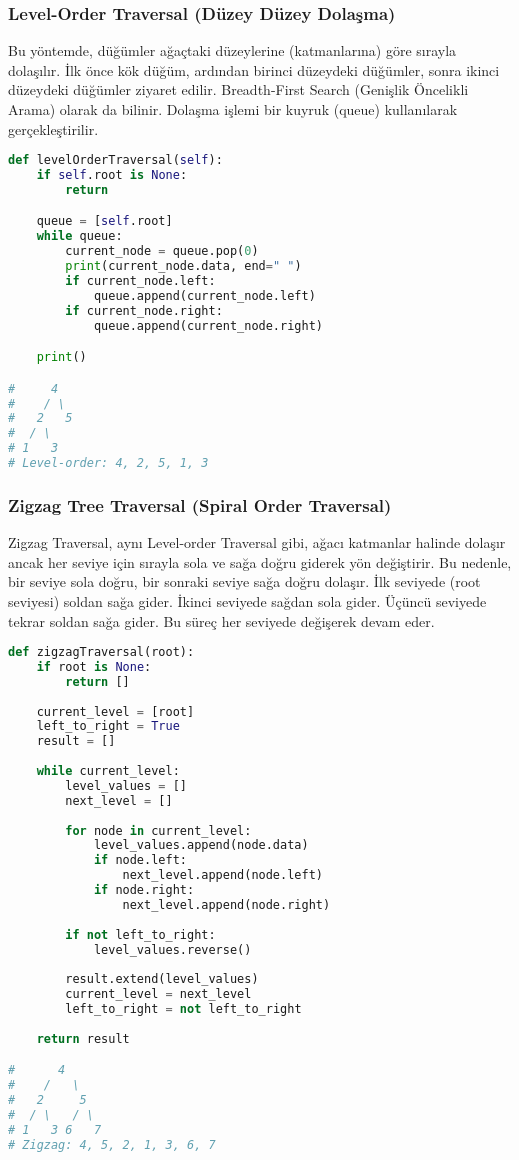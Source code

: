 \newpage

\subsubsection{Level-Order Traversal (Düzey Düzey Dolaşma)}

Bu yöntemde, düğümler ağaçtaki düzeylerine (katmanlarına) göre sırayla dolaşılır. İlk önce kök düğüm, ardından birinci düzeydeki düğümler, sonra ikinci düzeydeki düğümler ziyaret edilir. Breadth-First Search (Genişlik Öncelikli Arama) olarak da bilinir. Dolaşma işlemi bir kuyruk (queue) kullanılarak gerçekleştirilir.

\begin{lstlisting}[language=Python]
def levelOrderTraversal(self):
    if self.root is None:
        return

    queue = [self.root]
    while queue:
        current_node = queue.pop(0)
        print(current_node.data, end=" ")
        if current_node.left:
            queue.append(current_node.left)
        if current_node.right:
            queue.append(current_node.right)

    print()

#     4
#    / \
#   2   5
#  / \
# 1   3
# Level-order: 4, 2, 5, 1, 3
\end{lstlisting}

\newpage

\subsubsection{Zigzag Tree Traversal (Spiral Order Traversal)}

Zigzag Traversal, aynı Level-order Traversal gibi, ağacı katmanlar halinde dolaşır ancak her seviye için sırayla sola ve sağa doğru giderek yön değiştirir. Bu nedenle, bir seviye sola doğru, bir sonraki seviye sağa doğru dolaşır. İlk seviyede (root seviyesi) soldan sağa gider. İkinci seviyede sağdan sola gider. Üçüncü seviyede tekrar soldan sağa gider. Bu süreç her seviyede değişerek devam eder.

\begin{lstlisting}[language=Python]
def zigzagTraversal(root):
    if root is None:
        return []
    
    current_level = [root]
    left_to_right = True
    result = []
    
    while current_level:
        level_values = []
        next_level = []
        
        for node in current_level:
            level_values.append(node.data)
            if node.left:
                next_level.append(node.left)
            if node.right:
                next_level.append(node.right)
        
        if not left_to_right:
            level_values.reverse()
        
        result.extend(level_values)
        current_level = next_level
        left_to_right = not left_to_right
    
    return result

#      4
#    /   \
#   2     5
#  / \   / \
# 1   3 6   7
# Zigzag: 4, 5, 2, 1, 3, 6, 7
\end{lstlisting}

